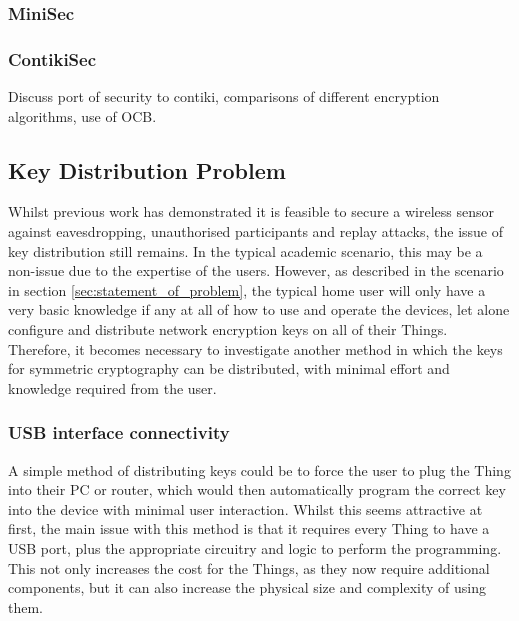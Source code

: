 \documentclass{mprop}
\begin{document}
\subsubsection{MiniSec} %
\label{ssub:minisec}


\subsubsection{ContikiSec} %
\label{ssub:contikisec}

\cite{ContikiSec}
Discuss port of security to contiki, comparisons of different encryption algorithms, use of OCB. 

\subsection{Key Distribution Problem} %
\label{sub:key_distribution_problem}

Whilst previous work has demonstrated it is feasible to secure a wireless sensor against eavesdropping, unauthorised participants and replay attacks, the issue of key distribution still remains.
In the typical academic scenario, this may be a non-issue due to the expertise of the users. However, as described in the scenario in section \ref{sec:statement_of_problem}, the typical home user will only have a very basic knowledge if any at all of how to use and operate the devices, let alone configure and distribute network encryption keys on all of their Things. Therefore, it becomes necessary to investigate another method in which the keys for symmetric cryptography can be distributed, with minimal effort and knowledge required from the user.

\subsubsection{USB interface connectivity} %
\label{ssub:usb_interface_connectivity}
A simple method of distributing keys could be to force the user to plug the Thing into their PC or router, which would then automatically program the correct key into the device with minimal user interaction. Whilst this seems attractive at first, the main issue with this method is that it requires every Thing to have a USB port, plus the appropriate circuitry and logic to perform the programming. This not only increases the cost for the Things, as they now require additional components, but it can also increase the physical size and complexity of using them.
\end{document}

